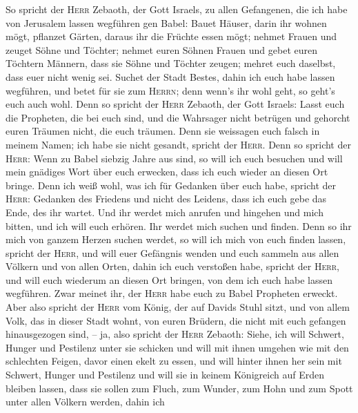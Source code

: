  So spricht der \textsc{Herr} Zebaoth, der Gott Israels,
zu allen Gefangenen, die ich habe von Jerusalem lassen wegführen gen
Babel:  Bauet Häuser, darin ihr wohnen mögt, pflanzet
Gärten, daraus ihr die Früchte essen mögt;  nehmet Frauen
und zeuget Söhne und Töchter; nehmet euren Söhnen Frauen und gebet euren
Töchtern Männern, dass sie Söhne und Töchter zeugen; mehret euch
daselbst, dass euer nicht wenig sei.  Suchet der Stadt
Bestes, dahin ich euch habe lassen wegführen, und betet für sie zum
\textsc{Herrn}; denn wenn's ihr wohl geht, so geht's euch auch wohl.
 Denn so spricht der \textsc{Herr} Zebaoth, der Gott
Israels: Lasst euch die Propheten, die bei euch sind, und die Wahrsager
nicht betrügen und gehorcht euren Träumen nicht, die euch träumen.
 Denn sie weissagen euch falsch in meinem Namen; ich habe
sie nicht gesandt, spricht der \textsc{Herr}.  Denn so
spricht der \textsc{Herr}: Wenn zu Babel siebzig Jahre aus sind, so will
ich euch besuchen und will mein gnädiges Wort über euch erwecken, dass
ich euch wieder an diesen Ort bringe.  Denn ich weiß
wohl, was ich für Gedanken über euch habe, spricht der \textsc{Herr}:
Gedanken des Friedens und nicht des Leidens, dass ich euch gebe das
Ende, des ihr wartet.  Und ihr werdet mich anrufen und
hingehen und mich bitten, und ich will euch erhören.  Ihr
werdet mich suchen und finden. Denn so ihr mich von ganzem Herzen suchen
werdet,  so will ich mich von euch finden lassen, spricht
der \textsc{Herr}, und will euer Gefängnis wenden und euch sammeln aus
allen Völkern und von allen Orten, dahin ich euch verstoßen habe,
spricht der \textsc{Herr}, und will euch wiederum an diesen Ort bringen,
von dem ich euch habe lassen wegführen.  Zwar meinet ihr,
der \textsc{Herr} habe euch zu Babel Propheten erweckt. 
Aber also spricht der \textsc{Herr} vom König, der auf Davids Stuhl
sitzt, und von allem Volk, das in dieser Stadt wohnt, von euren Brüdern,
die nicht mit euch gefangen hinausgezogen sind,  -- ja,
also spricht der \textsc{Herr} Zebaoth: Siehe, ich will Schwert, Hunger
und Pestilenz unter sie schicken und will mit ihnen umgehen wie mit den
schlechten Feigen, davor einen ekelt zu essen,  und will
hinter ihnen her sein mit Schwert, Hunger und Pestilenz und will sie in
keinem Königreich auf Erden bleiben lassen, dass sie sollen zum Fluch,
zum Wunder, zum Hohn und zum Spott unter allen Völkern werden, dahin ich
